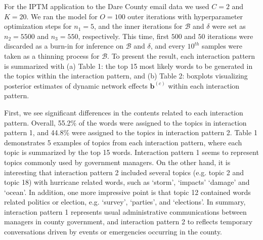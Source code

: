   For the IPTM application to the Dare County email data we used $C=2$ and $K=20$. We ran the model for $O=100$ outer iterations with hyperparameter optimization steps for $n_1=5$, and the inner iterations for $\mathcal{B}$ and $\delta$ were set as $n_2=5500$ and $n_3 = 550$, respectively. This time, first $500$ and $50$ iterations were discarded as a burn-in for inference on  $\mathcal{B}$ and $\delta$, and every $10^{th}$ samples were taken as a thinning process for $\mathcal{B}$. To present the result, each interaction pattern is summarized with (a) Table 1: the top 15 most likely words to be generated in the topics within the interaction pattern, and (b) Table 2: boxplots visualizing posterior estimates of dynamic network effects $\boldsymbol{b}^{(c)}$ within each interaction pattern.
  
  First, we see significant differences in the contents related to each interaction pattern. Overall, 55.2\% of the words were assigned to the topics in interaction pattern 1, and 44.8\% were assigned to the topics in interaction pattern 2. Table 1 demonstrates 5 examples of topics from each interaction pattern, where each topic is summarized by the top 15 words. Interaction pattern 1 seems to represent topics commonly used by government managers. On the other hand, it is interesting that interaction pattern 2 included several topics (e.g. topic 2 and topic 18) with hurricane related words, such as `storm', `impacts' `damage' and `ocean'. In addition, one more impressive point is that topic 12 contained words related politics or election, e.g. `survey', `parties', and `elections'. In summary, interaction pattern 1 represents usual administrative communications between managers in county government, and interaction pattern 2 to reflects temporary conversations driven by events or emergencies occurring in the county.

